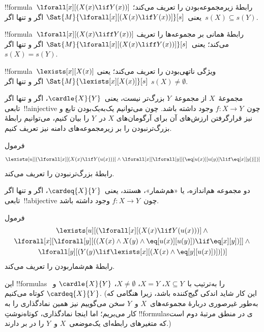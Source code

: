 \documentclass[../../../include/open-logic-section]{subfiles}
\begin{document}


\begin{prop}
!!{formula}~$\lforall[x][(X(x) \lif Y(x))]$ رابطهٔ زیرمجموعه‌بودن را
تعریف می‌کند؛ یعنی~$\Sat{M}{\lforall[x][(X(x) \lif Y(x))]}[s]$ اگر و
تنها اگر~$s(X) \subseteq s(Y)$.
\end{prop}

\begin{prop}
!!{formula}~$\lforall[x][(X(x) \liff Y(x))]$ رابطهٔ همانی بر مجموعه‌ها
را تعریف می‌کند؛ یعنی~$\Sat{M}{\lforall[x][(X(x) \liff Y(x))]}[s]$ اگر
و تنها اگر~$s(X) = s(Y)$.
\end{prop}

\begin{prop}
!!{formula}~$\lexists[x][X(x)]$ ویژگی ناتهی‌بودن را تعریف می‌کند؛ یعنی
$\Sat{M}{\lexists[x][X(x)]}[s]$ اگر و تنها اگر
$s(X) \neq \emptyset$.
\end{prop}

مجموعهٔ~$X$ از مجموعهٔ~$Y$ بزرگ‌تر نیست، یعنی~$\cardle{X}{Y}$، اگر و
تنها اگر تابعی~!!a{injective} چون~$f\colon X \to Y$ وجود داشته باشد. چون
می‌توانیم یک‌به‌یک‌بودن تابع و نیز قرارگرفتن ارزش‌های آن برای آرگومان‌های
$X$ در~$Y$ را بیان کنیم، می‌توانیم رابطهٔ بزرگ‌ترنبودن را بر
زیرمجموعه‌های دامنه نیز تعریف کنیم.

\begin{prop}
فرمول
\[
\lexists[u][(\lforall[x][(X(x) \lif Y(u(x)))] \land \lforall[x][\lforall[y][(\eq[u(x)][u(y)] \lif
      \eq[x][y])]])]
\]
رابطهٔ بزرگ‌ترنبودن را تعریف می‌کند.
\end{prop}

دو مجموعه هم‌اندازه، یا «هم‌شمار»، هستند، یعنی~$\cardeq{X}{Y}$، اگر و
تنها اگر تابعی~!!a{bijective} چون~$f\colon X \to Y$ وجود داشته باشد.

\begin{prop}
فرمول
\begin{multline*}
  \lexists[u][(\lforall[x][(X(x) \lif Y(u(x)))] \land {}\\
    \lforall[x][\lforall[y][((X(x) \land X(y) \land \eq[u(x)][u(y)]) \lif \eq[x][y])]]
  \land {} \\ \lforall[y][(Y(y) \lif \lexists[x][(X(x)
      \land \eq[y][u(x)])])])]
\end{multline*}
رابطهٔ هم‌شماربودن را تعریف می‌کند.
\end{prop}

این !!{formula}s را به‌ترتیب با~$X \subseteq Y$، $X = Y$،
$X \neq \emptyset$، $\cardle{X}{Y}$ و~$\cardeq{X}{Y}$ کوتاه می‌کنیم.
(این کار شاید اندکی گیج‌کننده باشد، زیرا هنگامی که به‌طور غیرصوری
دربارهٔ مجموعه‌های~$X$ و~$Y$ سخن می‌گوییم نیز همین نمادگذاری را به کار
می‌بریم؛ اما اینجا نمادگذاری، کوتاه‌نوشتِ !!{formula}sی در منطق مرتبهٔ
دوم است که متغیرهای رابطه‌ای یک‌موضعی~$X$ و~$Y$ را در بر دارند.)
\end{document}
